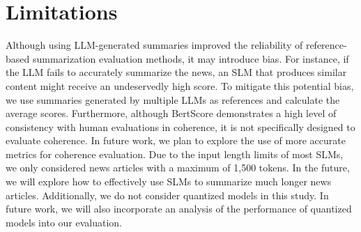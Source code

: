 

\section*{Limitations}

Although using LLM-generated summaries improved the reliability of reference-based summarization evaluation methods, it may introduce bias. For instance, if the LLM fails to accurately summarize the news, an SLM that produces similar content might receive an undeservedly high score. To mitigate this potential bias, we use summaries generated by multiple LLMs as references and calculate the average scores. Furthermore, although BertScore demonstrates a high level of consistency with human evaluations in coherence, it is not specifically designed to evaluate coherence. In future work, we plan to explore the use of more accurate metrics for coherence evaluation. Due to the input length limits of most SLMs, we only considered news articles with a maximum of 1,500 tokens. In the future, we will explore how to effectively use SLMs to summarize much longer news articles. Additionally, we do not consider quantized models in this study. In future work, we will also incorporate an analysis of the performance of quantized models into our evaluation.
